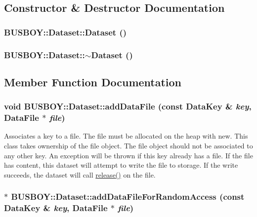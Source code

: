 \subsection{Constructor \& Destructor Documentation}
\hypertarget{classBUSBOY_1_1Dataset_aa524e8c1b07c915f28b4ae9c66c5265c}{
\subsubsection[{Dataset}]{\setlength{\rightskip}{0pt plus 5cm}BUSBOY::Dataset::Dataset ()}}
\label{classBUSBOY_1_1Dataset_aa524e8c1b07c915f28b4ae9c66c5265c}
\hypertarget{classBUSBOY_1_1Dataset_a0fe9b3b0bf6d816dadbe9295e55df8e9}{
\subsubsection[{$\sim$Dataset}]{\setlength{\rightskip}{0pt plus 5cm}BUSBOY::Dataset::$\sim$Dataset ()}}
\label{classBUSBOY_1_1Dataset_a0fe9b3b0bf6d816dadbe9295e55df8e9}


\subsection{Member Function Documentation}
\hypertarget{classBUSBOY_1_1Dataset_af6eac442d6a9fdb58c3914086968a4be}{
\subsubsection[{addDataFile}]{\setlength{\rightskip}{0pt plus 5cm}void BUSBOY::Dataset::addDataFile (const {\bf DataKey} \& {\em key}, \/  {\bf DataFile} $\ast$ {\em file})}}
\label{classBUSBOY_1_1Dataset_af6eac442d6a9fdb58c3914086968a4be}


Associates a key to a file. The file must be allocated on the heap with new. This class takes ownership of the file object. The file object should not be associated to any other key. An exception will be thrown if this key already has a file. If the file has content, this dataset will attempt to write the file to storage. If the write succeeds, the dataset will call \hyperlink{classBUSBOY_1_1Dataset_a51764b4447cad2364b5ea16415e08b67}{release()} on the file. \hypertarget{classBUSBOY_1_1Dataset_af197d624275b6978aed7c687a897722a}{
\subsubsection[{addDataFileForRandomAccess}]{ $\ast$ BUSBOY::Dataset::addDataFileForRandomAccess (const {\bf DataKey} \& {\em key}, \/  {\bf DataFile} $\ast$ {\em file})}}
\label{classBUSBOY_1_1Dataset_af197d624275b6978aed7c687a897722a}


